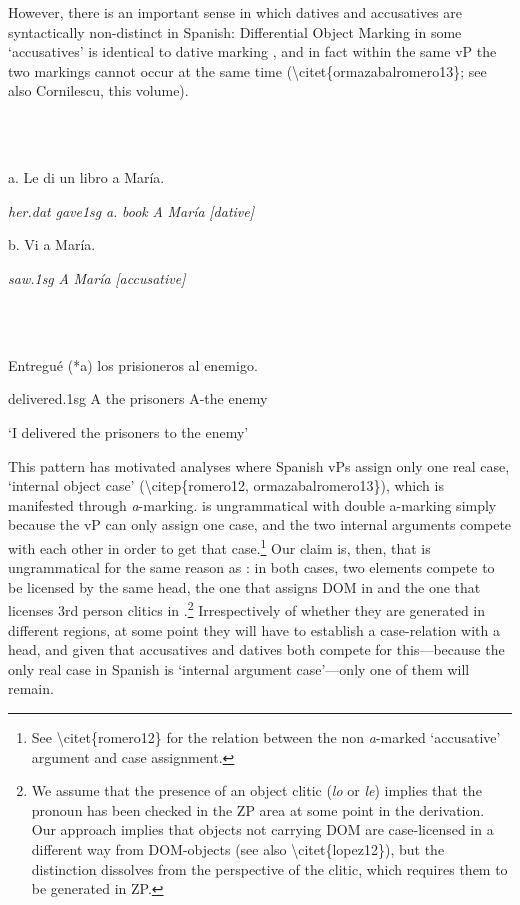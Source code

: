 \documentclass[output=paper,modfonts,nonflat]{langsci/langscibook}
\begin{document}
However, there is an important sense in which datives and accusatives are syntactically non-distinct in Spanish: Differential Object Marking in some ‘accusatives’ is identical to dative marking , and in fact within the same vP the two markings cannot occur at the same time  ({\textbackslash}citet\{ormazabalromero13\}; see also Cornilescu, this volume).

\ea%
    \label{ex:key:19}
    \gll\\
        \\
    \glt
    \z

          a.   Le     di     un libro a María.

    \textit{her.dat}   \textit{gave1sg}  \textit{a.}  \textit{book} \textit{A} \textit{María} \textit{[dative]}

  b.   Vi      a María.

    \textit{saw.1sg} \textit{A} \textit{María} \textit{[accusative]}

\ea%
    \label{ex:key:20}
    \gll\\
        \\
    \glt
    \z

         Entregué   (*a) los prisioneros   al     enemigo.

  delivered.1sg   A  the prisoners  A-the    enemy

  ‘I delivered the prisoners to the enemy’

This pattern has motivated analyses where Spanish vPs assign only one real case, ‘internal object case’ ({\textbackslash}citep\{romero12, ormazabalromero13\}), which is manifested through \textit{a}{}-marking.  is ungrammatical with double a-marking simply because the vP can only assign one case, and the two internal arguments compete with each other in order to get that case.\footnote{See {\textbackslash}citet\{romero12\} for the relation between the non \textit{a}{}-marked ‘accusative’ argument and case assignment.}  Our claim is, then, that  is ungrammatical for the same reason as : in both cases, two elements compete to be licensed by the same head, the one that assigns DOM in  and the one that licenses 3rd person clitics in .\footnote{We assume that the presence of an object clitic (\textit{lo} or \textit{le}) implies that the pronoun has been checked in the ZP area at some point in the derivation. Our approach implies that objects not carrying DOM are case-licensed in a different way from DOM-objects (see also {\textbackslash}citet\{lopez12\}), but the distinction dissolves from the perspective of the clitic, which requires them to be generated in ZP.} Irrespectively of whether they are generated in different regions, at some point they will have to establish a case-relation with a head, and given that accusatives and datives both compete for this—because the only real case in Spanish is ‘internal argument case’—only one of them will remain.
\end{document}
